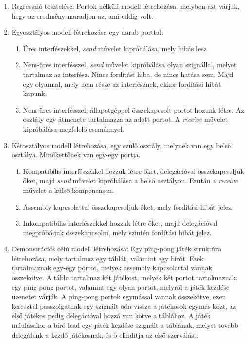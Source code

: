 \documentclass[a4paper,12pt]{report}
\begin{document}
\begin{enumerate}
\item Regresszió tesztelése: Portok nélküli modell létrehozása, melyben azt várjuk, hogy az eredmény maradjon az, ami eddig volt.
\item Egyosztályos modell létrehozása egy darab porttal:
\begin{enumerate}
\item Üres interfészekkel, \textit{send} művelet kipróbálása, mely hibás lesz
\item Nem-üres interfésszel, \textit{send} művelet kipróbálása olyan szignállal, melyet tartalmaz az interfész. Nincs fordítási hiba, de nincs hatása sem. Majd egy olyannal, mely nem része az interfésznek, ekkor fordítási hibát kapunk.
\item Nem-üres interfésszel, állapotgéppel összekapcsolt portot hozunk létre. Az osztály egy átmenete tartalmazza az adott portot. A \textit{receive} művelet kipróbálása megfelelő eseménnyel.
\end{enumerate}
\item Kétosztályos modell létrehozása, egy szülő osztály, melynek van egy belső osztálya. Mindkettőnek van egy-egy portja.
\begin{enumerate}
\item Kompatibilis interfészekkel hozzuk létre őket, delegációval összekapcsoljuk őket, majd \textit{send} művelet kipróbálása a belső osztályon. Ezután a \textit{receive} művelet a külső komponensen.
\item Assembly kapcsolattal összekapcsoljuk őket, mely fordítási hibát jelez.
\item Inkompatibilis interfészekkel hozzuk létre őket, majd delegációval megpróbáljuk összekapcsolni, mely szintén fordítási hibát jelez.
\end{enumerate}
\item Demonstrációs célú modell létrehozása: Egy ping-pong játék struktúra létrehozása, mely tartalmaz egy táblát, valamint egy bírót. Ezek tartalmaznak egy-egy portot, melyek assembly kapcsolattal vannak összekötve. A tábla tartalmaz két játékost, melyek két portot tartalmaznak, egy ping-pong portot, valamint egy olyan portot, melyről a játék kezdése üzenetet várják. A ping-pong portok egymással vannak összekötve, ezen keresztül passzolgatnak egy szignált oda-vissza a játékosok egymás közt, az első játékos pedig delegációval hozzá van kötve a táblához. A játék indulásakor a bíró lead egy játék kezdése szignált a táblának, melyet tovább delegálunk a kezdő játékosnak, és ő elindítja az első szerválást.
\end{enumerate}
\end{document}
